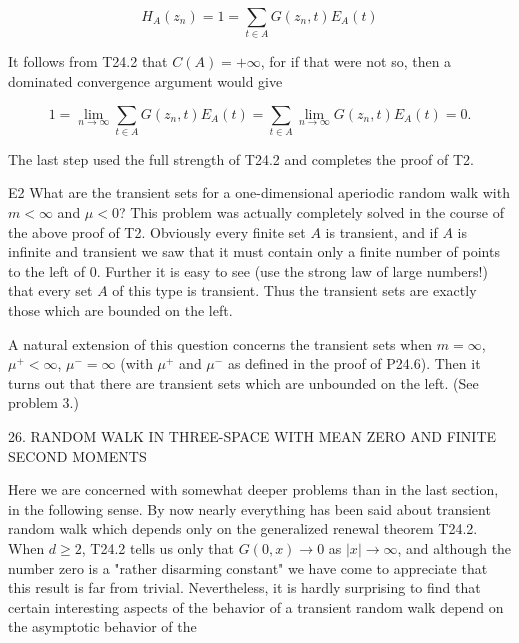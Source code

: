 $$H_A(z_n) = 1 = \sum_{t \in A} G(z_n,t)E_A(t)$$

It follows from T24.2 that $C(A) = +\infty$, for if that were not so, then a dominated convergence argument would give

$$1 = \lim_{n \to \infty} \sum_{t \in A} G(z_n,t)E_A(t) = \sum_{t \in A} \lim_{n \to \infty} G(z_n,t)E_A(t) = 0.$$

The last step used the full strength of T24.2 and completes the proof of T2.

E2 What are the transient sets for a one-dimensional aperiodic random walk with $m < \infty$ and $\mu < 0$? This problem was actually completely solved in the course of the above proof of T2. Obviously every finite set $A$ is transient, and if $A$ is infinite and transient we saw that it must contain only a finite number of points to the left of 0. Further it is easy to see (use the strong law of large numbers!) that every set $A$ of this type is transient. Thus the transient sets are exactly those which are bounded on the left.

A natural extension of this question concerns the transient sets when $m = \infty$, $\mu^+ < \infty$, $\mu^- = \infty$ (with $\mu^+$ and $\mu^-$ as defined in the proof of P24.6). Then it turns out that there are transient sets which are unbounded on the left. (See problem 3.)

26. RANDOM WALK IN THREE-SPACE WITH MEAN ZERO AND FINITE SECOND MOMENTS

Here we are concerned with somewhat deeper problems than in the last section, in the following sense. By now nearly everything has been said about transient random walk which depends only on the generalized renewal theorem T24.2. When $d \geq 2$, T24.2 tells us only that $G(0,x) \to 0$ as $|x| \to \infty$, and although the number zero is a "rather disarming constant" we have come to appreciate that this result is far from trivial. Nevertheless, it is hardly surprising to find that certain interesting aspects of the behavior of a transient random walk depend on the asymptotic behavior of the
